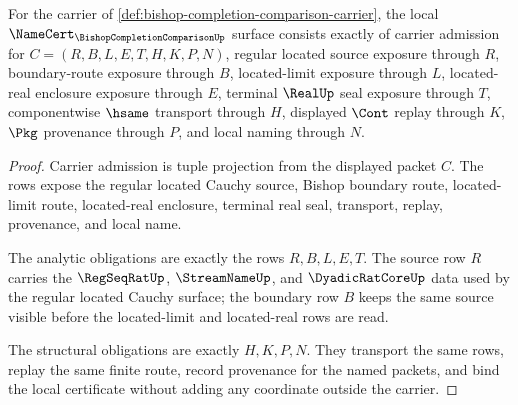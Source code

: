 \begin{theorem}
\label{thm:bishop-completion-comparison-namecert-obligations}
For the carrier of \autoref{def:bishop-completion-comparison-carrier}, the local $\NameCert_{\BishopCompletionComparisonUp}$ surface consists exactly of carrier admission for $C=(R,B,L,E,T,H,K,P,N)$, regular located source exposure through $R$, boundary-route exposure through $B$, located-limit exposure through $L$, located-real enclosure exposure through $E$, terminal $\RealUp$ seal exposure through $T$, componentwise $\hsame$ transport through $H$, displayed $\Cont$ replay through $K$, $\Pkg$ provenance through $P$, and local naming through $N$.
\end{theorem}
\begin{proof}
Carrier admission is tuple projection from the displayed packet $C$. The rows expose the regular located Cauchy source, Bishop boundary route, located-limit route, located-real enclosure, terminal real seal, transport, replay, provenance, and local name.

The analytic obligations are exactly the rows $R,B,L,E,T$. The source row $R$ carries the $\RegSeqRatUp$, $\StreamNameUp$, and $\DyadicRatCoreUp$ data used by the regular located Cauchy surface; the boundary row $B$ keeps the same source visible before the located-limit and located-real rows are read.

The structural obligations are exactly $H,K,P,N$. They transport the same rows, replay the same finite route, record provenance for the named packets, and bind the local certificate without adding any coordinate outside the carrier.
\end{proof}

